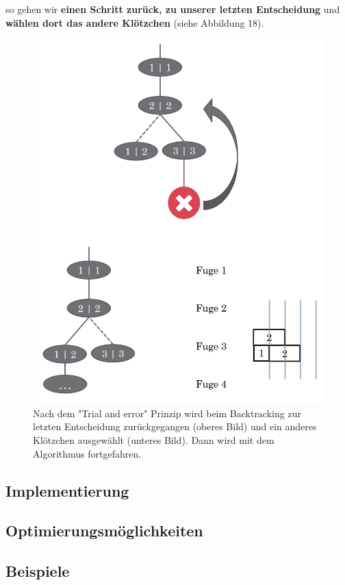\documentclass[a4paper,12pt]{article}
\begin{document}
so gehen wir \textbf{einen Schritt zurück, zu unserer letzten Entscheidung} und \textbf{wählen dort das andere Klötzchen} (siehe Abbildung 18).
\begin{figure}[H]
    \centering
    \includegraphics[width=1\linewidth]{Bilder/Aufgabe1/Backtracking_03_04.png}
    \caption{Nach dem "Trial and error" Prinzip wird beim Backtracking zur letzten Entscheidung zurückgegangen (oberes Bild) und ein anderes Klötzchen ausgewählt (unteres Bild). Dann wird mit dem Algorithmus fortgefahren.}
\end{figure}
\subsection{Implementierung}

\subsection{Optimierungsmöglichkeiten}

\subsection{Beispiele}
\end{document}
